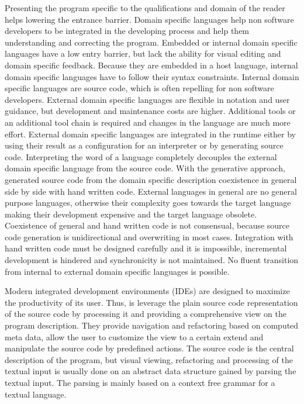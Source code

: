 Presenting the program specific to the qualifications and domain of the reader helps lowering the entrance barrier. Domain specific languages help non software developers to be integrated in the developing process and help them understanding and correcting the program. Embedded or internal domain specific languages have a low entry barrier, but lack the ability for visual editing and domain specific feedback. Because they are embedded in a host language, internal domain specific languages have to follow their syntax constraints. Internal domain specific languages are source code, which is often repelling for non software developers. External domain specific languages are flexible in notation and user guidance, but development and maintenance costs are higher. Additional tools or an additional tool chain is required and changes in the language are much more effort. External domain specific languages are integrated in the runtime either by using their result as a configuration for an interpreter or by generating source code. Interpreting the word of a language completely decouples the external domain specific language from the source code. With the generative approach, generated source code from the domain specific description coexistence in general side by side with hand written code. External languages in general are no general purpose languages, otherwise their complexity goes towards the target language making their development expensive and the target language obsolete. Coexistence of general and hand written code is not consensual, because source code generation is unidirectional and overwriting in most cases. Integration with hand written code must be designed carefully and it is impossible, incremental development is hindered and synchronicity is not maintained. No fluent transition from internal to external domain specific languages is possible.   

Modern integrated development environments (IDEs) are designed to maximize the productivity of its user. Thus, is leverage the plain source code representation of the source code by processing it and providing a comprehensive view on the program description. They provide navigation and refactoring based on computed meta data, allow the user to customize the view to a certain extend and manipulate the source code by predefined actions. The source code is the central description of the program, but visual viewing, refactoring and processing of the textual input is usually done on an abstract data structure gained by parsing the textual input. The parsing is mainly based on a context free grammar for a textual language. 

